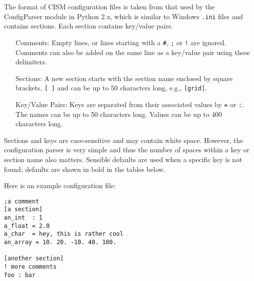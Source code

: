 The format of CISM configuration files is taken from that used by the 
ConfigParser module in Python 2.x, which is similar to Windows \texttt{.ini} files 
and contains sections. Each section contains key/value pairs.

\begin{itemize}
\item[Comments:] Empty lines, or lines starting with a \texttt{\#}, \texttt{;} or \texttt{!} are ignored.  Comments can also be added on the same line as a key/value pair using these delimiters.
\item[Sections:] A new section starts with the section name enclosed by square brackets, \texttt{[ ]} and can be up to 50 characters long, e.g., \texttt{[grid]}.
\item[Key/Value Pairs:] Keys are separated from their associated values by \texttt{=} or \texttt{:}. The names can be up to 50 characters long. Values can be up to 400 characters long.
\end{itemize}

Sections and keys are case-sensitive and may contain white space. 
However, the configuration parser is very simple and thus the number of spaces 
within a key or section name also matters. Sensible defaults are used when 
a specific key is not found; defaults are shown in bold in the tables below.

Here is an example configuration file:
\begin{verbatim}
;a comment
[a section]
an_int  : 1
a_float = 2.0
a_char  = hey, this is rather cool
an_array = 10. 20. -10. 40. 100.

[another section]
! more comments
foo : bar
\end{verbatim}



